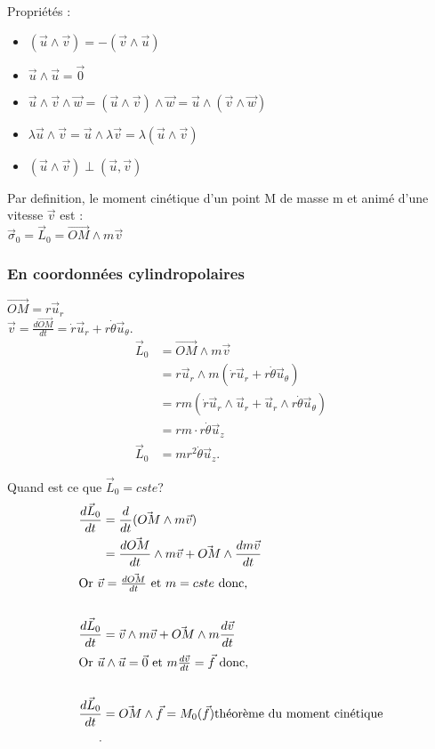 \documentclass{article}
\begin{document}
Propriétés : \\
\begin{itemize}
    \item \((\vec{u}\wedge\vec{v}) = - (\vec{v} \wedge \vec{u})\)
    \item \(\vec{u} \wedge \vec{u} = \vec{0}\)
    \item \(\vec{u} \wedge \vec{v} \wedge \vec{w} = (\vec{u}\wedge \vec{v}) \wedge \vec{w} = \vec{u} \wedge (\vec{v} \wedge \vec{w})\)
    \item \(\lambda \vec{u} \wedge \vec{v} = \vec{u} \wedge \lambda\vec{v} = \lambda (\vec{u}\wedge \vec{v})\)
    \item \((\vec{u}\wedge\vec{v})\perp(\vec{u},\vec{v})\)
\end{itemize}

Par definition, le moment cinétique d'un point M de masse m et animé d'une vitesse \(\vec{v}\) est : \\
\(\vec{\sigma}_0 = \vec{L}_0 = \vec{OM}\wedge m\vec{v}\)
\subsubsection{En coordonnées cylindropolaires}

\(\vec{OM} = r \vec{u}_r\)\\
\(\vec{v} = \frac{d\vec{OM}}{dt} = \dot{r}\vec{u}_r + r\dot{\theta}\vec{u}_\theta\).\\
\begin{align*}
    \vec{L}_0 &= \vec{OM} \wedge m\vec{v} \\
    &= r\vec{u}_r \wedge m(\dot{r}\vec{u}_r + r\dot{\theta}\vec{u}_\theta) \\
    &= rm(\dot{r}\vec{u}_r \wedge \vec{u}_r +\vec{u}_r\wedge r\dot{\theta}\vec{u}_\theta) \\
    &= rm\cdot r\dot{\theta}\vec{u}_z \\
    \vec{L}_0 &= mr^2\dot{\theta}\vec{u}_z
.\end{align*}

Quand est ce que \(\vec{L}_0 = cste\)?\\
\begin{align*}
    \frac{d\vec{L}_0}{dt}&= \frac{d}{dt} (\vec{OM}\wedge m\vec{v}) \\
    &= \frac{d\vec{OM}}{dt}\wedge m\vec{v} + \vec{OM}\wedge \frac{dm\vec{v}}{dt}   \\
    \intertext{Or $\vec{v} = \frac{d\vec{OM}}{dt}$ et $m = cste$ donc, }\\
    \frac{d\vec{L}_0}{dt} &= \vec{v}\wedge m\vec{v}+ \vec{OM} \wedge m\frac{d\vec{v}}{dt}\\
    \intertext{Or \(\vec{u}\wedge \vec{u} = \vec{0}\) et \(m \frac{d\vec{v}}{dt} = \vec{f} \) donc,}\\
    \frac{d\vec{L}_0}{dt} &= \vec{OM}\wedge \vec{f} = M_0(\vec{f}) \text{théorème du moment cinétique}\\
.\end{align*}
\end{document}
